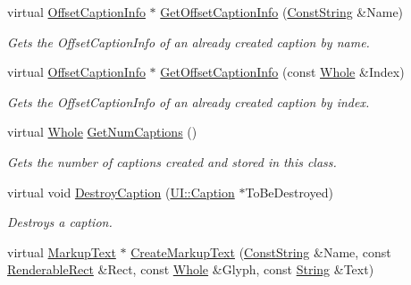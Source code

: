 \begin{DoxyCompactItemize}
virtual \hyperlink{structphys_1_1UI_1_1ResizingInfo}{OffsetCaptionInfo} $\ast$ \hyperlink{classphys_1_1UI_1_1Window_afa081532c017f5e8c4f04bfd2df207b6}{GetOffsetCaptionInfo} (\hyperlink{namespacephys_a5ce5049f8b4bf88d6413c47b504ebb31}{ConstString} \&Name)
\begin{DoxyCompactList}\small\item\em Gets the OffsetCaptionInfo of an already created caption by name. \item\end{DoxyCompactList}\item 
virtual \hyperlink{structphys_1_1UI_1_1ResizingInfo}{OffsetCaptionInfo} $\ast$ \hyperlink{classphys_1_1UI_1_1Window_a64dc0b65518151f3f36bb4ad40505804}{GetOffsetCaptionInfo} (const \hyperlink{namespacephys_a460f6bc24c8dd347b05e0366ae34f34a}{Whole} \&Index)
\begin{DoxyCompactList}\small\item\em Gets the OffsetCaptionInfo of an already created caption by index. \item\end{DoxyCompactList}\item 
virtual \hyperlink{namespacephys_a460f6bc24c8dd347b05e0366ae34f34a}{Whole} \hyperlink{classphys_1_1UI_1_1Window_a125d78e98b47a4d93f6414545fd2374c}{GetNumCaptions} ()
\begin{DoxyCompactList}\small\item\em Gets the number of captions created and stored in this class. \item\end{DoxyCompactList}\item 
virtual void \hyperlink{classphys_1_1UI_1_1Window_a4e3dbe56ca1efce7ac1d26ceb8f7e915}{DestroyCaption} (\hyperlink{classphys_1_1UI_1_1Caption}{UI::Caption} $\ast$ToBeDestroyed)
\begin{DoxyCompactList}\small\item\em Destroys a caption. \item\end{DoxyCompactList}\item 
virtual \hyperlink{classphys_1_1UI_1_1MarkupText}{MarkupText} $\ast$ \hyperlink{classphys_1_1UI_1_1Window_a048621c7d504f9bf75d68e62a7384849}{CreateMarkupText} (\hyperlink{namespacephys_a5ce5049f8b4bf88d6413c47b504ebb31}{ConstString} \&Name, const \hyperlink{structphys_1_1UI_1_1RenderableRect}{RenderableRect} \&Rect, const \hyperlink{namespacephys_a460f6bc24c8dd347b05e0366ae34f34a}{Whole} \&Glyph, const \hyperlink{namespacephys_aa03900411993de7fbfec4789bc1d392e}{String} \&Text)

\end{DoxyCompactItemize}
